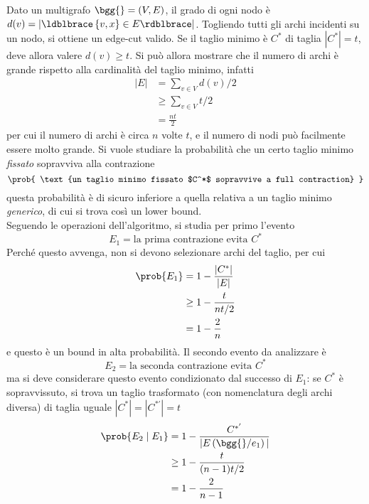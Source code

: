 Dato un multigrafo $
\bgg{}
=
\left( V, E \right)
$, il grado di ogni nodo è $
d(v) =
|
\ldblbrace
\left\{ 
    v, x
\right\}
\in E
\rdblbrace
|
$.
Togliendo tutti gli archi incidenti su un nodo, si ottiene un edge-cut valido.
Se il taglio minimo è $
C^*
$ di taglia $
|C^*| = t
$, deve allora valere $
d(v) \geq t
$.
Si può allora mostrare che il numero di archi è grande rispetto alla cardinalità del taglio minimo, infatti
\begin{align*}
    |E|
    &= 
    \sum_{v \in V} d(v)
    \bigg/ 2
    \\
    & \geq 
    \sum_{v \in V} t
    \bigg/ 2
    \\
    &= 
    \frac{nt}{2}
\end{align*}
per cui il numero di archi è circa $n$ volte $t$, e il numero di nodi può facilmente essere molto grande.
Si vuole studiare la probabilità che un certo taglio minimo \emph{fissato} sopravviva alla contrazione
\begin{equation*}
    \prob{
        \text{un taglio minimo fissato $C^*$ sopravvive a full contraction}
    }
\end{equation*}
questa probabilità è di sicuro inferiore a quella relativa a un taglio minimo \emph{generico}, di cui si trova così un lower bound.
\\
Seguendo le operazioni dell'algoritmo, si studia per primo l'evento 
\begin{equation*}
    E_1 = 
    \text{la prima contrazione evita }
    C^*
\end{equation*}
Perché questo avvenga, non si devono selezionare archi del taglio, per cui
\begin{align*}
    \prob{E_1}
    &= 
    1 - 
    \frac{|C^*|}{|E|}
    \\
    &
    \geq
    1 - 
    \frac{t}{nt/2}
    \\
    &= 
    1 - 
    \frac{2}{n}
\end{align*}
e questo è un bound in alta probabilità.
Il secondo evento da analizzare è
\begin{equation*}
    E_2 = 
    \text{la seconda contrazione evita }
    C^*
\end{equation*}
ma si deve considerare questo evento condizionato dal successo di $E_1$:
se $
C^*
$ è sopravvissuto, si trova un taglio trasformato (con nomenclatura degli archi diversa) di taglia uguale $
|C^*|
=
|
C^{*'}
|
=
t
$
\begin{align*}
    \prob{
        E_2 \mid E_1
    }
    &= 
    1 -
    \frac{
        C^{*'}
    }{
        |E\left( \bgg{} / e_1 \right)|
    }
    \\
    &
    \geq
    1 - 
    \frac{t}{(n-1)t/2}
    \\
    &= 
    1 - 
    \frac{2}{n-1}
\end{align*}
